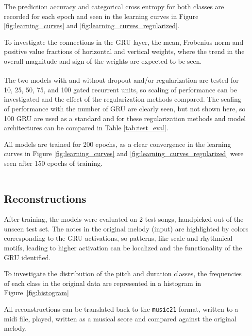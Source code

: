 The prediction accuracy and categorical cross entropy for both classes are recorded for each epoch and seen in the learning curves in Figure \ref{fig:learning_curves} and \ref{fig:learning_curves_regularized}.

To investigate the connections in the GRU layer, the mean, Frobenius norm and positive value fractions of horizontal and vertical weights, where the trend in the overall magnitude and sign of the weights are expected to be seen. \\ \\

The two models with and without dropout and/or regularization are tested for 10, 25, 50, 75, and 100 gated recurrent units, so scaling of performance can be investigated and the effect of the regularization methods compared. The scaling of performance with the number of GRU are clearly seen, but not shown here, so 100 GRU are used as a standard and for these regularization methods and model architectures can be compared in Table \ref{tab:test_eval}.

All models are trained for 200 epochs, as a clear convergence in the learning curves in Figure \ref{fig:learning_curves} and \ref{fig:learning_curves_regularized} were seen after 150 epochs of training. \\ \\

\subsection{Reconstructions}

After training, the models were evaluated on 2 test songs, handpicked out of the unseen test set. The notes in the original melody (input) are highlighted by colors corresponding to the GRU activations, so patterns, like scale and rhythmical motifs, leading to higher activation can be localized and the functionality of the GRU identified.

To investigate the distribution of the pitch and duration classes, the frequencies of each class in the original data are represented in a histogram in Figure~\ref{fig:histogram}

All reconstructions can be translated back to the \texttt{music21} format, written to a midi file, played, written as a musical score and compared against the original melody.

